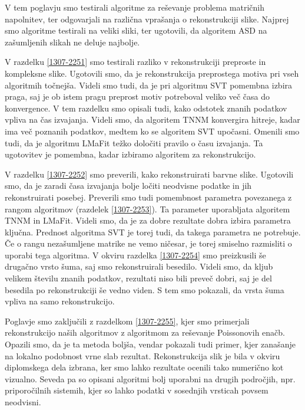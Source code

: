  \label{2107-1444}
V tem poglavju smo testirali algoritme za reševanje problema matričnih napolnitev, ter  odgovarjali na različna vprašanja o rekonstrukciji slike. Najprej smo algoritme testirali na veliki sliki, ter ugotovili, da algoritem ASD na zašumljenih slikah ne deluje najbolje.  

V razdelku \ref{1307-2251} smo testirali razliko v rekonstrukciji preproste in kompleksne slike. Ugotovili smo, da je rekonstrukcija preprostega motiva pri vseh algoritmih točnejša. Videli smo tudi, da je pri algoritmu SVT pomembna izbira praga, saj je ob istem pragu preprost motiv potreboval veliko več časa do konvergence. V tem razdelku smo opisali tudi, kako odstotek znanih podatkov vpliva na čas izvajanja. Videli smo, da algoritem TNNM konvergira hitreje, kadar ima več poznanih podatkov, medtem ko se algoritem SVT upočasni. Omenili smo tudi, da je algoritmu LMaFit težko določiti pravilo o času izvajanja. Ta ugotovitev je pomembna, kadar izbiramo algoritem za rekonstrukcijo.

V razdelku \ref{1307-2252} smo preverili, kako rekonstruirati barvne slike. Ugotovili smo, da je zaradi časa izvajanja bolje ločiti neodvisne podatke in jih rekonstruirati posebej. Preverili smo tudi pomembnost parametra povezanega z rangom algoritmov (razdelek \ref{1307-2253}). Ta parameter uporabljata algoritem TNNM in LMaFit. Videli smo, da je za dobre rezultate dobra izbira parametra ključna. Prednost algoritma SVT je torej tudi, da takega parametra ne potrebuje. Če o rangu nezašumljene matrike ne vemo ničesar, je torej smiselno razmisliti o uporabi tega algoritma. V okviru razdelka \ref{1307-2254} smo preizkusili še drugačno vrsto šuma, saj smo rekonstruirali besedilo. Videli smo, da kljub velikem številu znanih podatkov, rezultati niso bili preveč dobri, saj je del besedila po rekonstrukciji še vedno viden. S tem smo pokazali, da vrsta šuma vpliva na samo rekonstrukcijo.

Poglavje smo zaključili z razdelkom \ref{1307-2255}, kjer smo primerjali rekonstrukcijo naših algoritmov z algoritmom za reševanje Poissonovih enačb. Opazili smo, da je ta metoda boljša, vendar pokazali tudi primer, kjer zanašanje na lokalno podobnost vrne slab rezultat. Rekonstrukcija slik je bila v okviru diplomskega dela izbrana, ker smo lahko rezultate ocenili tako numerično kot vizualno. Seveda pa so opisani algoritmi bolj uporabni na drugih področjih, npr. priporočilnih sistemih, kjer so lahko podatki v sosednjih vrsticah povsem neodvisni.  